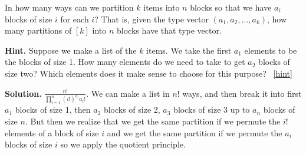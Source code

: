 \documentclass{book}
\begin{document}
\setcounter{project}{276}
\addtocounter{project}{-1}
\begin{activity}[]\label{partitionsgivenpartsize}
\hypertarget{p-1441}{}%
In how many ways can we partition \(k\) items into \(n\) blocks so that we have \(a_i\) blocks of size \(i\) for each \(i\)? That is, given the type vector \((a_1, a_2, \ldots, a_k)\), how many partitions of \([k]\) into \(n\) blocks have that type vector.%
\par\smallskip%
\noindent\textbf{Hint.}\hypertarget{hint-180}{}\quad%
\hypertarget{p-1442}{}%
Suppose we make a list of the \(k\) items. We take the first \(a_1\) elements to be the blocks of size 1. How many elements do we need to take to get \(a_2\) blocks of size two? Which elements does it make sense to choose for this purpose?%
~\hfill{\tiny\hyperlink{a-276}{[hint]}\hypertarget{q-276}{}}\par\smallskip%
\noindent\textbf{Solution.}\hypertarget{solution-190}{}\quad%
\hypertarget{p-1443}{}%
\(\frac{n!}{\prod_{i=1}^n (i!)^{a_i}{a_i!}}\). We can make a list in \(n!\) ways, and then break it into first \(a_1\) blocks of size 1, then \(a_2\) blocks of size 2, \(a_3\) blocks of size 3 up to \(a_n\) blocks of size \(n\). But then we realize that we get the same partition if we permute the \(i!\) elements of a block of size \(i\) and we get the same partition if we permute the \(a_i\) blocks of size \(i\) so we apply the quotient principle.%
\end{activity}
\end{document}
